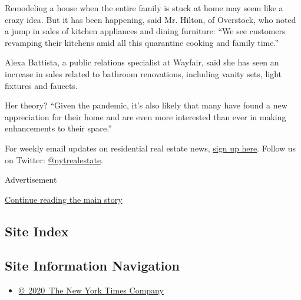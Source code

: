 Remodeling a house when the entire family is stuck at home may seem like
a crazy idea. But it has been happening, said Mr. Hilton, of Overstock,
who noted a jump in sales of kitchen appliances and dining furniture:
``We see customers revamping their kitchens amid all this quarantine
cooking and family time.''

Alexa Battista, a public relations specialist at Wayfair, said she has
seen an increase in sales related to bathroom renovations, including
vanity sets, light fixtures and faucets.

Her theory? ``Given the pandemic, it's also likely that many have found
a new appreciation for their home and are even more interested than ever
in making enhancements to their space.''

For weekly email updates on residential real estate news,
\href{http://www.nytimes3xbfgragh.onion/newsletters/realestate/}{sign up
here}. Follow us on Twitter:
\href{https://twitter.com/nytrealestate}{@nytrealestate}.

Advertisement

\protect\hyperlink{after-bottom}{Continue reading the main story}

\hypertarget{site-index}{%
\subsection{Site Index}\label{site-index}}

\hypertarget{site-information-navigation}{%
\subsection{Site Information
Navigation}\label{site-information-navigation}}

\begin{itemize}
\tightlist
\item
  \href{https://help.nytimes3xbfgragh.onion/hc/en-us/articles/115014792127-Copyright-notice}{©~2020~The
  New York Times Company}
\end{itemize}

